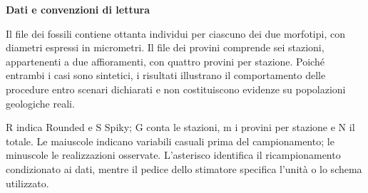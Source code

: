 \documentclass[12pt,aspectratio=1610]{beamer}
\begin{document}
\begin{frame}[plain]
\end{frame}
\begin{lrbox}{\TitleBox}\begin{minipage}[t]{18.2cm}\raggedright\sloppy\color{Ink}\fontsize{20.7}{24}\selectfont \bfseries\color{Navy}Dati e convenzioni di lettura\end{minipage}\end{lrbox}
\begin{lrbox}{\BodyBox}\begin{minipage}[t]{10.25cm}\raggedright\sloppy\color{Ink}\fontsize{12.4}{16.4}\selectfont Il file dei fossili contiene ottanta individui per ciascuno dei due morfotipi, con diametri espressi in micrometri. Il file dei provini comprende sei stazioni, appartenenti a due affioramenti, con quattro provini per stazione. Poiché entrambi i casi sono sintetici, i risultati illustrano il comportamento delle procedure entro scenari dichiarati e non costituiscono evidenze su popolazioni geologiche reali.\par{}\end{minipage}\end{lrbox}
\begin{lrbox}{\SideBox}\begin{minipage}[t]{7.45cm}\raggedright\sloppy\color{Ink}\fontsize{12.2}{16.1}\selectfont R indica Rounded e S Spiky; G conta le stazioni, m i provini per stazione e N il totale. Le maiuscole indicano variabili casuali prima del campionamento; le minuscole le realizzazioni osservate. L’asterisco identifica il ricampionamento condizionato ai dati, mentre il pedice dello stimatore specifica l’unità o lo schema utilizzato.\end{minipage}\end{lrbox}
\end{document}
